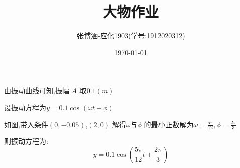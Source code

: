 \documentclass{article}
\title{大物作业}
\author{张博涵-应化1903(学号:1912020312)}
\date{\today}
\begin{document}
	\maketitle
	由振动曲线可知,振幅 $A$ 取$0.1(m)$
	
	设振动方程为$y=0.1\cos(\omega t +\phi)$
	
	如图,带入条件$(0,-0.05)$,$(2,0)$
	解得$\omega$与$\phi$
	的最小正数解为$\omega=\displaystyle\frac{5\pi}{12},\phi =\displaystyle \frac{2\pi}{3}$
	
	则振动方程为:
	$$y=0.1\cos(\frac{5\pi}{12}t +\frac{2\pi}{3})$$
	
\end{document}
